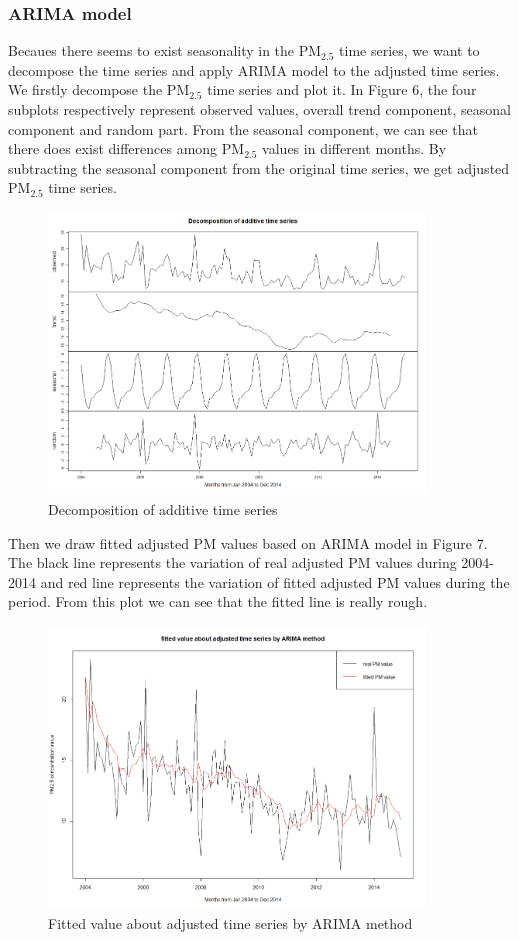 \documentclass[10pt]{article}
\begin{document}
\subsubsection{ARIMA model}
  Becaues there seems to exist seasonality in the PM$_{2.5}$ time series, we want to decompose the time series and apply ARIMA model to the adjusted time series. We firstly decompose the PM$_{2.5}$ time series and plot it. In Figure 6, the four subplots respectively represent observed values, overall trend component, seasonal component and random part. From the seasonal component, we can see that there does exist differences among PM$_{2.5}$ values in different months. By subtracting the seasonal component from the original time series, we get adjusted PM$_{2.5}$ time series.

\begin{figure}[H]
\centering
\includegraphics[width = 100mm]{ts4.png}
\caption{Decomposition of additive time series}
\end{figure}

Then we draw fitted adjusted PM values based on ARIMA model in Figure 7. The black line represents the variation of real adjusted PM values during 2004-2014  and red line represents the variation of fitted adjusted PM values during the period. From this plot we can see that the fitted line is really rough.

\begin{figure}[H]
\centering
\includegraphics[width = 100mm]{ts5.png}
\caption{Fitted value about adjusted time series by ARIMA method}
\end{figure}
\end{document}
